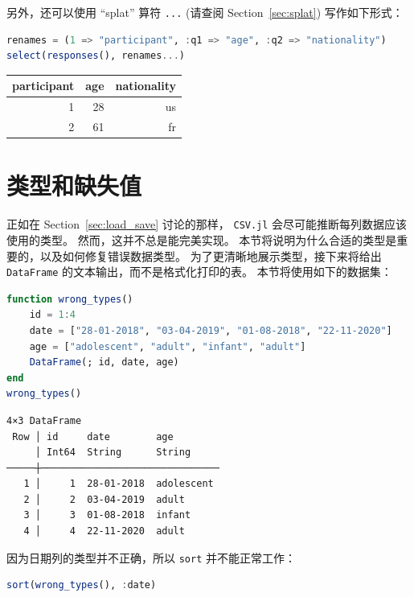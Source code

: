 \documentclass[
  notoc %
]{tufte-book}
\newcommand{\passthrough}[1]{#1}
\begin{document}
另外，还可以使用 ``splat'' 算符 \passthrough{\lstinline!...!} (请查阅
Section~\ref{sec:splat}) 写作如下形式：

\begin{lstlisting}[language=Julia]
renames = (1 => "participant", :q1 => "age", :q2 => "nationality")
select(responses(), renames...)
\end{lstlisting}

\begin{longtable}[]{@{}rrr@{}}
\toprule
participant & age & nationality \\
\midrule
\endhead
1 & 28 & us \\
2 & 61 & fr \\
\bottomrule
\end{longtable}

\hypertarget{sec:missing_data}{%
\section{类型和缺失值}\label{sec:missing_data}}

正如在 Section~\ref{sec:load_save} 讨论的那样，
\passthrough{\lstinline!CSV.jl!} 会尽可能推断每列数据应该使用的类型。
然而，这并不总是能完美实现。
本节将说明为什么合适的类型是重要的，以及如何修复错误数据类型。
为了更清晰地展示类型，接下来将给出 \passthrough{\lstinline!DataFrame!}
的文本输出，而不是格式化打印的表。 本节将使用如下的数据集：

\begin{lstlisting}[language=Julia]
function wrong_types()
    id = 1:4
    date = ["28-01-2018", "03-04-2019", "01-08-2018", "22-11-2020"]
    age = ["adolescent", "adult", "infant", "adult"]
    DataFrame(; id, date, age)
end
wrong_types()
\end{lstlisting}

\begin{lstlisting}[language=Output]
4×3 DataFrame
 Row │ id     date        age
     │ Int64  String      String
─────┼───────────────────────────────
   1 │     1  28-01-2018  adolescent
   2 │     2  03-04-2019  adult
   3 │     3  01-08-2018  infant
   4 │     4  22-11-2020  adult
\end{lstlisting}

因为日期列的类型并不正确，所以 \passthrough{\lstinline!sort!}
并不能正常工作：

\begin{lstlisting}[language=Julia]
sort(wrong_types(), :date)
\end{lstlisting}
\end{document}

